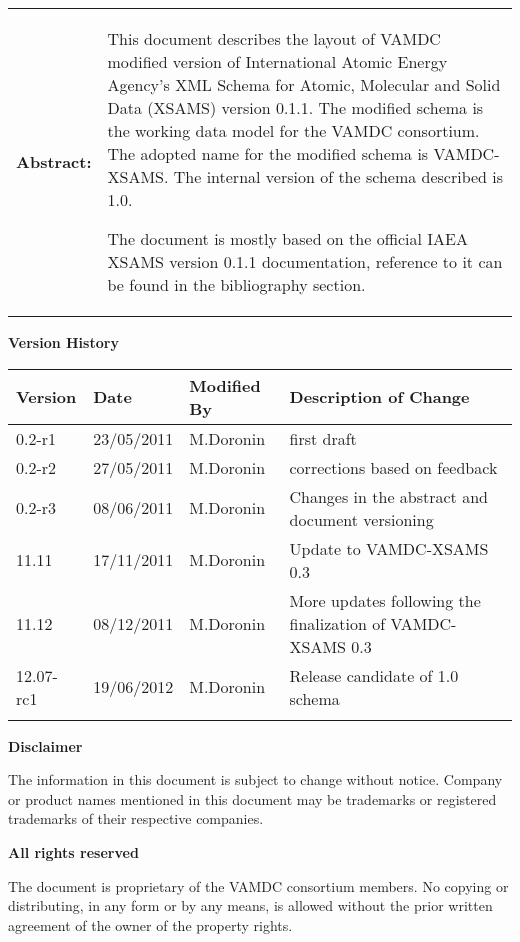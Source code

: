 {\begin{titlepage}
\begin{tabular}{p{1.7in}p{4.3in}}
\textbf{Abstract:} & 
This document describes the layout of VAMDC modified version of
International Atomic Energy Agency's XML Schema for Atomic, Molecular and Solid Data (XSAMS) version 0.1.1.
The modified schema is the working data model for the VAMDC consortium.
The adopted name for the modified schema is VAMDC-XSAMS.
The internal version of the schema described is 1.0.

The document is mostly based on the official IAEA XSAMS version 0.1.1 documentation, reference to it can be found
in the bibliography section.
\end{tabular}



\end{titlepage}

\noindent \textbf{Version History}

\textbf{}

\noindent \begin{tabular}{|l|l|l|l|} 
\hline 
\textbf{Version} & \textbf{Date} & \textbf{Modified By} & \textbf{Description of Change} \\ \hline 
0.2-r1	& 23/05/2011 & M.Doronin & first draft \\ \hline 
0.2-r2	& 27/05/2011 & M.Doronin & corrections based on feedback \\ \hline 
0.2-r3	& 08/06/2011 & M.Doronin & Changes in the abstract and document versioning \\ \hline 
11.11 	& 17/11/2011 & M.Doronin & Update to VAMDC-XSAMS 0.3 \\ \hline 
11.12 	& 08/12/2011 & M.Doronin & More updates following the finalization of VAMDC-XSAMS 0.3 \\ \hline 
12.07-rc1 & 19/06/2012 & M.Doronin & Release candidate of 1.0 schema \\ \hline 
 &  &  &  \\ \hline 
\end{tabular}

\textbf{}

\noindent \textbf{Disclaimer}

\noindent The information in this document is subject to change without notice. Company or product names mentioned in this document may be trademarks or registered trademarks of their respective companies.


\textbf{}

\noindent \textbf{All rights reserved}

\noindent The document is proprietary of the VAMDC consortium members. No copying or distributing, in any form or by any means, is allowed without the prior written agreement of the owner of the property rights.

}
